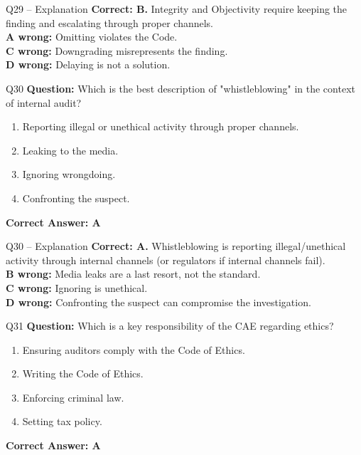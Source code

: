 \documentclass[aspectratio=169,10pt]{beamer}
\begin{document}
	\begin{frame}[t]{Q29 -- Explanation}
		\small
		\textbf{Correct: B.} Integrity and Objectivity require keeping the finding and escalating through proper channels. \\[4pt]
		\textbf{A wrong:} Omitting violates the Code. \\[2pt]
		\textbf{C wrong:} Downgrading misrepresents the finding. \\[2pt]
		\textbf{D wrong:} Delaying is not a solution.
	\end{frame}
	
	\begin{frame}[t]{Q30}
		\small
		\textbf{Question:} Which is the best description of "whistleblowing" in the context of internal audit?
		\begin{enumerate}[label=\Alph*.,itemsep=1pt,topsep=2pt]
			\item Reporting illegal or unethical activity through proper channels.
			\item Leaking to the media.
			\item Ignoring wrongdoing.
			\item Confronting the suspect.
		\end{enumerate}
		\vspace{4pt}
		\textbf{Correct Answer: A}
	\end{frame}
	
	\begin{frame}[t]{Q30 -- Explanation}
		\small
		\textbf{Correct: A.} Whistleblowing is reporting illegal/unethical activity through internal channels (or regulators if internal channels fail). \\[4pt]
		\textbf{B wrong:} Media leaks are a last resort, not the standard. \\[2pt]
		\textbf{C wrong:} Ignoring is unethical. \\[2pt]
		\textbf{D wrong:} Confronting the suspect can compromise the investigation.
	\end{frame}
	
	\begin{frame}[t]{Q31}
		\small
		\textbf{Question:} Which is a key responsibility of the CAE regarding ethics?
		\begin{enumerate}[label=\Alph*.,itemsep=1pt,topsep=2pt]
			\item Ensuring auditors comply with the Code of Ethics.
			\item Writing the Code of Ethics.
			\item Enforcing criminal law.
			\item Setting tax policy.
		\end{enumerate}
		\vspace{4pt}
		\textbf{Correct Answer: A}
	\end{frame}
	
\end{document}
